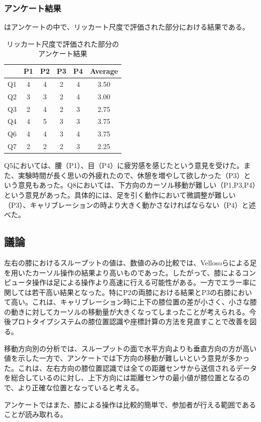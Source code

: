 \documentclass[submit, techrep]{ipsj}
\begin{document}
\subsubsection{アンケート結果}
はアンケートの中で、リッカート尺度で評価された部分における結果である。
\begin{table}[tb]
	\begin{center}
		\begin{tabular}{|c|c|c|c|c|c|}
		\hline
		   & P1 & P2 & P3 & P4 & Average \\ \hline
		Q1 & 4 & 4 & 2 & 4 & 3.50\\ \hline
		Q2 & 3 & 3 & 2 & 4 & 3.00\\ \hline
		Q3 & 2 & 4 & 2 & 3 & 2.75\\ \hline
		Q4 & 4 & 5 & 3 & 3 & 3.75\\ \hline
		\hline
		Q6 & 4 & 4 & 3 & 4 & 3.75\\ \hline
		Q7 & 2 & 2 & 2 & 3 & 2.25\\ \hline
		\end{tabular}
	\end{center}
	\caption{リッカート尺度で評価された部分のアンケート結果}
	\label{tb:quest}
\end{table}
Q5においては、腰（P1）、目（P4）に疲労感を感じたという意見を受けた。また、実験時間が長く思いの外疲れたので、休憩を増やして欲しかった（P3）という意見もあった。Q8においては、下方向のカーソル移動が難しい（P1,P3,P4）という意見があった。具体的には、足を引く動作において微調整が難しい（P3）、キャリブレーションの時より大きく動かさなければならない（P4）と述べた。

\subsection{議論}
左右の膝におけるスループットの値は、数値のみの比較では、Vellosoら\cite{velloso:hal-01599657}による足を用いたカーソル操作の結果より高いものであった。したがって、膝によるコンピュータ操作は足による操作より高速に行える可能性がある。一方でエラー率に関しては若干高い結果となった。特にP2の両膝における結果とP3の右膝において高い。これは、キャリブレーション時に上下の膝位置の差が小さく、小さな膝の動きに対してカーソルの移動量が大きくなってしまったことが考えられる。今後プロトタイプシステムの膝位置認識や座標計算の方法を見直すことで改善を図る。\par
移動方向別の分析では、スループットの面で水平方向よりも垂直方向の方が高い値を示した一方で、アンケートでは下方向の移動が難しいという意見が多かった。これは、左右方向の膝位置認識では全ての距離センサから送信されるデータを総合しているのに対し、上下方向には距離センサの最小値が膝位置となるので、より正確な位置となっていると考える。\par
アンケートではまた、膝による操作は比較的簡単で、参加者が行える範囲であることが読み取れる。
\end{document}
